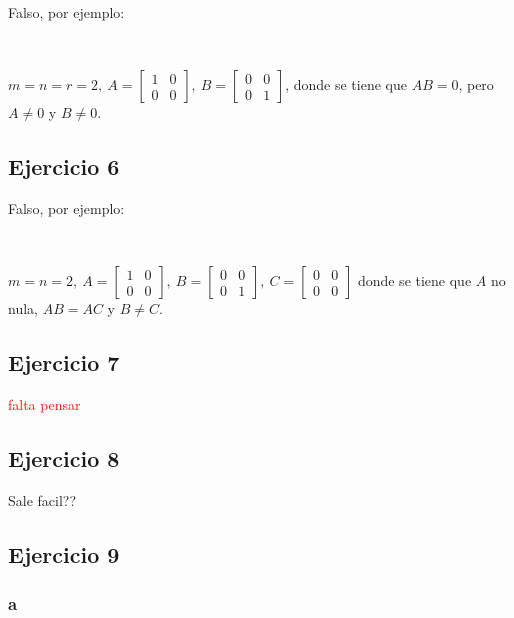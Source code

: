 \documentclass{article}
\begin{document}
Falso, por ejemplo:

\

\noindent $m = n = r = 2, ~
A = \begin{bmatrix}
    1 & 0 \\
    0 & 0
\end{bmatrix}, ~
B = \begin{bmatrix}
    0 & 0 \\
    0 & 1
\end{bmatrix}$, donde se tiene que $AB = 0$, pero $A \neq 0$ y $B \neq 0$.

\subsection*{Ejercicio 6}

Falso, por ejemplo:

\

\noindent $m = n = 2, ~
A = \begin{bmatrix}
    1 & 0 \\
    0 & 0
\end{bmatrix}, ~
B = \begin{bmatrix}
    0 & 0 \\
    0 & 1
\end{bmatrix}, ~
C = \begin{bmatrix}
    0 & 0 \\
    0 & 0
\end{bmatrix}$ donde se tiene que $A$ no nula, $AB = AC$ y $B \neq C$.

\subsection*{Ejercicio 7}

\textcolor{red}{falta pensar}

\subsection*{Ejercicio 8}

Sale facil??

\subsection*{Ejercicio 9}

\subsubsection*{a}
\end{document}

